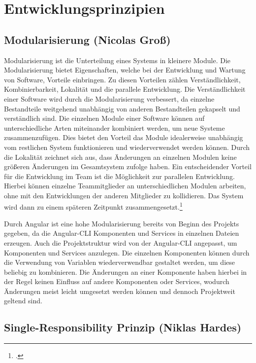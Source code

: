 
\section{Entwicklungsprinzipien}

\subsection*{Modularisierung (Nicolas Groß)}

Modularisierung ist die Unterteilung eines Systems in kleinere Module. Die Modularisierung bietet Eigenschaften, welche bei der Entwicklung und Wartung von Software, Vorteile einbringen.  Zu diesen Vorteilen zählen Verständlichkeit, Kombinierbarkeit, Lokalität und die parallele Entwicklung. Die Verständlichkeit einer Software wird durch die Modularisierung verbessert, da einzelne Bestandteile weitgehend unabhängig von anderen Bestandteilen gekapselt und verständlich sind. Die einzelnen Module einer Software können auf unterschiedliche Arten miteinander kombiniert werden, um neue Systeme zusammenzufügen. Dies bietet den Vorteil das Module idealerweise unabhängig vom restlichen System funktionieren und wiederverwendet werden können. Durch die Lokalität zeichnet sich aus, dass Änderungen an einzelnen Modulen keine größeren Änderungen im Gesamtsystem zufolge haben. Ein entscheidender Vorteil für die Entwicklung im Team ist die Möglichkeit zur parallelen Entwicklung. Hierbei können einzelne Teammitglieder an unterschiedlichen Modulen arbeiten, ohne mit den Entwicklungen der anderen Mitglieder zu kollidieren. Das System wird dann zu einem späteren Zeitpunkt zusammengesetzt.\footcite[.vgl]{Schmidauer2002}

Durch Angular ist eine hohe Modularisierung bereits von Beginn des Projekts gegeben, da die Angular-CLI Komponenten und Services in einzelnen Dateien erzeugen. Auch die Projektstruktur wird von der Angular-CLI angepasst, um Komponenten und Services anzulegen. Die einzelnen Komponenten können durch die Verwendung von Variablen wiederverwendbar gestaltet werden, um diese beliebig zu kombinieren. Die Änderungen an einer Komponente haben hierbei in der Regel keinen Einfluss auf andere Komponenten oder Services, wodurch Änderungen meist leicht umgesetzt werden können und dennoch Projektweit geltend sind.

\subsection*{Single-Responsibility Prinzip (Niklas Hardes)}

